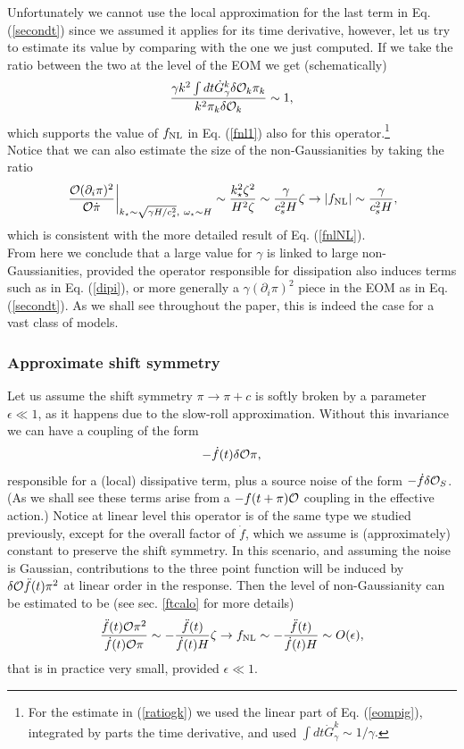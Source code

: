 \documentclass[11pt,amsmath,floats,floatfix,nofootinbib,secnumarabic, superscriptaddress, tightenlines]{revtex4}
\newcommand{\beq}{\begin{equation}}
\newcommand{\eeq}{\end{equation}}
\newcommand{\calo}{{\cal O}}
\begin{document}
{Unfortunately we cannot use the local approximation for the last term in Eq. (\ref{secondt}) since we assumed it applies for its time derivative, however, let us try to estimate its value by comparing with the one we just computed. If we take the ratio between the two at the level of the EOM we get (schematically)
\beq
\label{ratiogk}
\frac{ \gamma k^2 \int dt \dot G^k_\gamma \delta\calo_k\pi_k}{k^2\pi_k\delta\calo_k} \sim 1,
\eeq
which supports the value of $f_{\rm NL}$ in Eq. (\ref{fnl1}) also for this operator.\footnote{For the estimate in (\ref{ratiogk}) we used the linear part of Eq. (\ref{eompig}), integrated by parts the time derivative, and used $\int dt \dot G^k_\gamma \sim 1/\gamma.$}\\

Notice that we can also estimate the size of the non-Gaussianities by taking the ratio
\beq
\left.\frac{\calo (\partial_i \pi)^2}{\calo\dot\pi}\right|_{k_\star\sim \sqrt{\gamma H/c_s^2},~\omega_\star \sim H} \sim \frac{k_\star^2 \zeta^2}{H^2\zeta}\sim \frac{\gamma}{c_s^2H} \zeta \to |f_{\rm NL}| \sim \frac{\gamma}{c_s^2H},
\eeq
which is consistent with the more detailed result of Eq. (\ref{fnlNL}).\\

From here we conclude that a large value for $\gamma$ is linked to large non-Gaussianities, provided the operator responsible for dissipation also induces terms such as in Eq. (\ref{dipi}), or more generally a $\gamma (\partial_i \pi)^2$ piece in the EOM as in Eq. (\ref{secondt}). As we shall see throughout the paper, this is indeed the case for a vast class of models.

\subsubsection{Approximate shift symmetry}\label{appsh}

Let us assume the shift symmetry $\pi \to \pi+c$ is softly broken by a parameter $\epsilon \ll 1$, as it happens due to the slow-roll approximation. Without this invariance we can have a coupling of the form \beq \label{dotfdecalo}-\dot f(t)\delta\calo \pi, \eeq responsible for a (local) dissipative term, plus a source noise of the form $-\dot f \delta\calo_S$. (As we shall see these terms arise from a $-f(t+\pi)\calo$ coupling in the effective action.) Notice at linear level this operator is of the same type we studied previously, except for the overall factor of $\dot f$, which we assume is (approximately) constant to preserve the shift symmetry. In this scenario, and assuming the noise is Gaussian, contributions to the three point function will be induced by $\delta\calo \ddot f(t) \pi^2$ at linear order in the response. Then the level of non-Gaussianity can be estimated to be (see sec. \ref{ftcalo} for more details)
\beq
\label{estfto}
\frac{\ddot f(t)\calo \pi^2}{\dot f(t)\calo\pi} \sim -\frac{\ddot f(t)}{\dot f(t) H} \zeta \to f_{\rm NL} \sim -\frac{\ddot f(t)}{\dot f (t)H} \sim O(\epsilon),
\eeq
that is in practice very small, provided $\epsilon \ll 1$.

}
\end{document}
